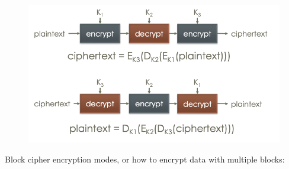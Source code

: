 \documentclass[../notes.tex]{subfiles}
\begin{document}
\begin{figure}[H]
    \centering
    \includegraphics[width=0.8\linewidth]{img/image_2023-02-10-00-19-51.png}
\end{figure}


Block cipher encryption modes, or how to encrypt data with multiple blocks:
\end{document}
